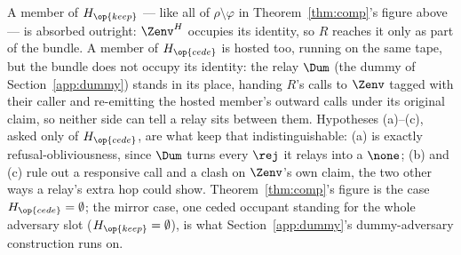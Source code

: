 \documentclass[10pt,oneside,openany]{book}
\newif\iffitdiagram \fitdiagramtrue
\newcounter{diagram}
\theoremstyle{accentdef}
\theoremstyle{accentplain}
\begin{document}
\begin{center}
\fitdiagramfalse
{}
\fitdiagramtrue
\end{center}

A member of $H_{\op{keep}}$ --- like all of $\rho \setminus \varphi$ in Theorem~\ref{thm:comp}'s
figure above --- is absorbed outright: $\Zenv^{H}$ occupies its identity, so $R$ reaches it only
as part of the bundle. A member of $H_{\op{cede}}$ is hosted too, running on the same tape, but
the bundle does not occupy its identity: the relay $\Dum$ (the dummy of
Section~\ref{app:dummy}) stands in its place, handing $R$'s calls to $\Zenv$ tagged with their
caller and re-emitting the hosted member's outward calls under its original claim, so neither
side can tell a relay sits between them. Hypotheses (a)--(c), asked only of $H_{\op{cede}}$, are
what keep that indistinguishable: (a) is exactly refusal-obliviousness, since $\Dum$ turns every
$\rej$ it relays into a $\none$; (b) and (c) rule out a responsive call and a clash on $\Zenv$'s
own claim, the two other ways a relay's extra hop could show. Theorem~\ref{thm:comp}'s figure is
the case $H_{\op{cede}} = \emptyset$; the mirror case, one ceded occupant standing for the whole
adversary slot ($H_{\op{keep}} = \emptyset$), is what Section~\ref{app:dummy}'s dummy-adversary
construction runs on.
\end{document}
